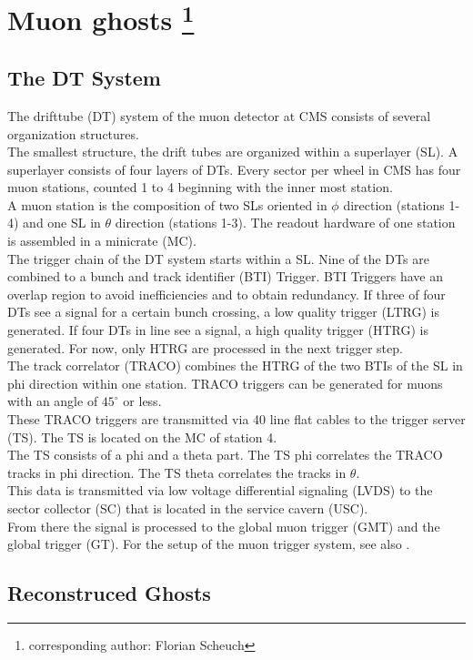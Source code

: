 \section[Muon ghosts]{Muon ghosts \footnote{corresponding author: Florian Scheuch}}
\subsection{The DT System}
\label{DTSystem}
The drifttube (DT) system of the muon detector at CMS consists of several organization structures.\\
The smallest structure, the drift tubes are organized within a superlayer (SL). A superlayer consists of four layers of DTs. Every sector per wheel in CMS has four muon stations, counted 1 to 4 beginning with the inner most station.\\
A muon station is the composition of two SLs oriented in $\phi$ direction (stations 1-4) and one SL in $\theta$ direction (stations 1-3). The readout hardware of one station is assembled in a minicrate (MC).\\
The trigger chain of the DT system starts within a SL. Nine of the DTs are combined to a bunch and track identifier (BTI) Trigger. BTI Triggers have an overlap region to avoid inefficiencies and to obtain redundancy. If three of four DTs see a signal for a certain bunch crossing, a low quality trigger (LTRG) is generated. If four DTs in line see a signal, a high quality trigger (HTRG) is generated. For now, only HTRG are processed in the next trigger step.\\
The track correlator (TRACO) combines the HTRG of the two BTIs of the SL in phi direction within one station. TRACO triggers can be generated for muons with an angle of $45^{\circ}$ \cite{bunchedBeamTest} or less.\\
These TRACO triggers are transmitted via 40 line flat cables to the trigger server (TS). The TS is located on the MC of station 4.\\
The TS consists of a phi and a theta part. The TS phi correlates the TRACO tracks in phi direction. The TS theta correlates the tracks in $\theta$.\\
This data is transmitted via low voltage differential signaling (LVDS) to the sector collector (SC) that is located in the service cavern (USC).\\
From there the signal is processed to the global muon trigger (GMT) and the global trigger (GT).
For the setup of the muon trigger system, see also \cite{cmsMuonProject}.
\subsection{Reconstruced Ghosts}
